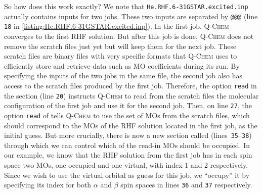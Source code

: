 			So how does this work exactly?
			We note that \texttt{He.RHF.6-31GSTAR.excited.inp} actually contains inputs for two jobs.
			These two inputs are separated by \texttt{@@@} (line \texttt{18} in \cref{listing:He.RHF.6-31GSTAR.excited.inp}).
			In the first job, \textsc{Q-Chem} converges to the first RHF solution.
			But after this job is done, \textsc{Q-Chem} does not remove the scratch files just yet but will keep them for the next job.
			These scratch files are binary files with very specific formats that \textsc{Q-Chem} uses to efficiently store and retrieve data such as MO coefficients during its run.
			By specifying the inputs of the two jobs in the same file, the second job also has access to the scratch files produced by the first job.
			Therefore, the option \texttt{read} in the  section (line \texttt{20}) instructs \textsc{Q-Chem} to read from the scratch files the molecular configuration of the first job and use it for the second job.
			Then, on line \texttt{27}, the option \texttt{read} of  tells \textsc{Q-Chem} to use the set of MOs from the scratch files, which should correspond to the MOs of the RHF solution located in the first job, as the initial guess.
			But more crucially, there is now a new section called  (lines~\texttt{35}--\texttt{38}) through which we can control which of the read-in MOs should be occupied.
			In our example, we know that the RHF solution from the first job has in each spin space two MOs, one occupied and one virtual, with index 1 and 2 respectively.
			Since we wish to use the virtual orbital as guess for this job, we ``occupy'' it by specifying its index for both $\alpha$ and $\beta$ spin spaces in lines \texttt{36} and \texttt{37} respectively.
			

